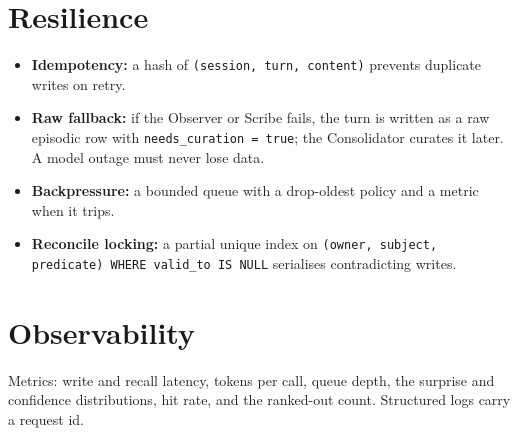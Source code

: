 \section{Resilience}
\begin{itemize}
  \item \textbf{Idempotency:} a hash of \texttt{(session, turn, content)} prevents duplicate writes on
  retry.
  \item \textbf{Raw fallback:} if the Observer or Scribe fails, the turn is written as a raw episodic
  row with \texttt{needs\_curation = true}; the Consolidator curates it later. A model outage must
  never lose data.
  \item \textbf{Backpressure:} a bounded queue with a drop-oldest policy and a metric when it trips.
  \item \textbf{Reconcile locking:} a partial unique index on
  \texttt{(owner, subject, predicate) WHERE valid\_to IS NULL} serialises contradicting writes.
\end{itemize}

\section{Observability}
Metrics: write and recall latency, tokens per call, queue depth, the surprise and confidence
distributions, hit rate, and the ranked-out count. Structured logs carry a request id.
